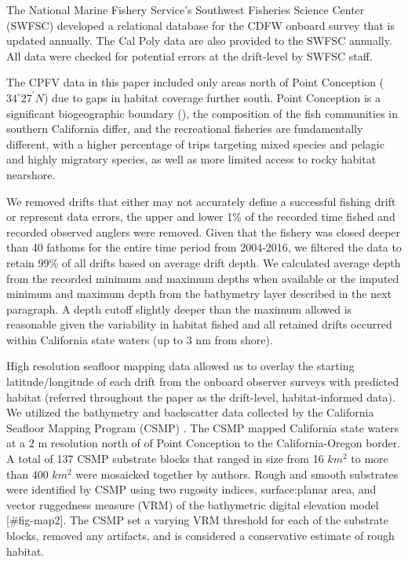\documentclass[
  12pt,
  authoryear,
  preprint,
  3p]{elsarticle}
\begin{document}
The National Marine Fishery Service's Southwest Fisheries Science Center
(SWFSC) developed a relational database for the CDFW onboard survey
\citeyearpar{Monk:2014:DRD} that is updated annually. The Cal Poly data
are also provided to the SWFSC annually. All data were checked for
potential errors at the drift-level by SWFSC staff.

The CPFV data in this paper included only areas north of Point
Conception (\(34^\circ 27^\prime N\)) due to gaps in habitat coverage
further south. Point Conception is a significant biogeographic boundary
(\citet{Valentine:1966:NAM}), the composition of the fish communities in
southern California differ, and the recreational fisheries are
fundamentally different, with a higher percentage of trips targeting
mixed species and pelagic and highly migratory species, as well as more
limited access to rocky habitat nearshore.

We removed drifts that either may not accurately define a successful
fishing drift or represent data errors, the upper and lower 1\% of the
recorded time fished and recorded observed anglers were removed. Given
that the fishery was closed deeper than 40 fathoms for the entire time
period from 2004-2016, we filtered the data to retain 99\% of all drifts
based on average drift depth. We calculated average depth from the
recorded minimum and maximum depths when available or the imputed
minimum and maximum depth from the bathymetry layer described in the
next paragraph. A depth cutoff slightly deeper than the maximum allowed
is reasonable given the variability in habitat fished and all retained
drifts occurred within California state waters (up to 3 nm from shore).

High resolution seafloor mapping data allowed us to overlay the starting
latitude/longitude of each drift from the onboard observer surveys with
predicted habitat (referred throughout the paper as the drift-level,
habitat-informed data). We utilized the bathymetry and backscatter data
collected by the California Seafloor Mapping Program (CSMP)
\citep{Golden:2013:CSW, CSUMB:2014:CSM}. The CSMP mapped California
state waters at a 2 m resolution north of of Point Conception to the
California-Oregon border. A total of 137 CSMP substrate blocks that
ranged in size from 16 \(km^2\) to more than 400 \(km^2\) were mosaicked
together by authors. Rough and smooth substrates were identified by CSMP
using two rugosity indices, surface:planar area, and vector ruggedness
measure (VRM) of the bathymetric digital elevation model
{[}\#fig-map2{]}. The CSMP set a varying VRM threshold for each of the
substrate blocks, removed any artifacts, and is considered a
conservative estimate of rough habitat.
\end{document}
